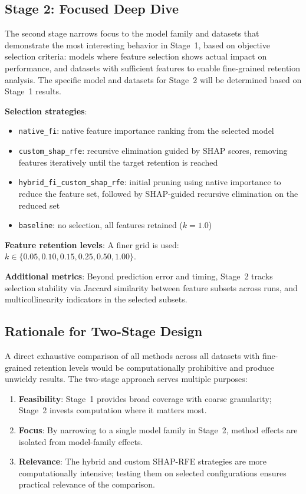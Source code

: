 \subsection{Stage 2: Focused Deep Dive}

The second stage narrows focus to the model family and datasets that demonstrate the most interesting behavior in Stage~1, based on objective selection criteria: models where feature selection shows actual impact on performance, and datasets with sufficient features to enable fine-grained retention analysis. The specific model and datasets for Stage~2 will be determined based on Stage~1 results.

\textbf{Selection strategies}:
\begin{itemize}
    \item \texttt{native\_fi}: native feature importance ranking from the selected model
    \item \texttt{custom\_shap\_rfe}: recursive elimination guided by SHAP scores, removing features iteratively until the target retention is reached
    \item \texttt{hybrid\_fi\_custom\_shap\_rfe}: initial pruning using native importance to reduce the feature set, followed by SHAP-guided recursive elimination on the reduced set
    \item \texttt{baseline}: no selection, all features retained ($k=1.0$)
\end{itemize}

\textbf{Feature retention levels}: A finer grid is used: $k \in \{0.05, 0.10, 0.15, 0.25, 0.50, 1.00\}$.

\textbf{Additional metrics}: Beyond prediction error and timing, Stage~2 tracks selection stability via Jaccard similarity between feature subsets across runs, and multicollinearity indicators in the selected subsets.

\subsection{Rationale for Two-Stage Design}

A direct exhaustive comparison of all methods across all datasets with fine-grained retention levels would be computationally prohibitive and produce unwieldy results. The two-stage approach serves multiple purposes:

\begin{enumerate}
    \item \textbf{Feasibility}: Stage~1 provides broad coverage with coarse granularity; Stage~2 invests computation where it matters most.
    \item \textbf{Focus}: By narrowing to a single model family in Stage~2, method effects are isolated from model-family effects.
    \item \textbf{Relevance}: The hybrid and custom SHAP-RFE strategies are more computationally intensive; testing them on selected configurations ensures practical relevance of the comparison.
\end{enumerate}

